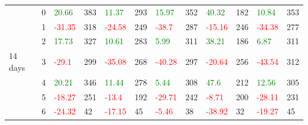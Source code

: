 \begin{table}[!htb]
\begin{adjustwidth}{-0.8in}{-0.9in}
\begin{tabular}{|p{4em}|p{2em}|p{3em}|p{3em}|p{3em}|p{3em}|p{3em}|p{3em}|p{3em}|p{3em}|p{3em}|p{3em}|}
            & 0 & \textcolor{green}{20.66} & 383 & \textcolor{green}{11.37} & 293 & \textcolor{green}{15.97} & 352 & \textcolor{green}{40.32} & 182 & \textcolor{green}{10.84} & 353\\\cline{3-12}
            & 1 & \textcolor{red}{-31.35} & 318 & \textcolor{red}{-24.58} & 249 & \textcolor{red}{-38.7} & 287 & \textcolor{red}{-15.16} & 246 & \textcolor{red}{-34.38} & 277\\\cline{3-12}
            & 2 & \textcolor{green}{17.73} & 327 & \textcolor{green}{10.61} & 283 & \textcolor{green}{5.99} & 311 & \textcolor{green}{38.21} & 186 & \textcolor{green}{6.87} & 311\\\cline{3-12}
            14 days & 3 & \textcolor{red}{-29.1} & 299 & \textcolor{red}{-35.08} & 268 & \textcolor{red}{-40.28} & 297 & \textcolor{red}{-20.64} & 256 & \textcolor{red}{-43.54} & 312\\\cline{3-12}
            & 4 & \textcolor{green}{20.21} & 346 & \textcolor{green}{11.44} & 278 & \textcolor{green}{5.44} & 308 & \textcolor{green}{47.6} & 212 & \textcolor{green}{12.56} & 305\\\cline{3-12}
            & 5 & \textcolor{red}{-18.27} & 251 & \textcolor{red}{-13.4} & 192 & \textcolor{red}{-29.71} & 242 & \textcolor{red}{-8.71} & 200 & \textcolor{red}{-28.11} & 231\\\cline{3-12}
            & 6 & \textcolor{red}{-24.32} & 42 & \textcolor{red}{-17.15} & 45 & \textcolor{red}{-5.46} & 38 & \textcolor{red}{-38.92} & 32 & \textcolor{red}{-19.27} & 45\\\hline\hline


\end{tabular}
\end{adjustwidth}
\end{table}
